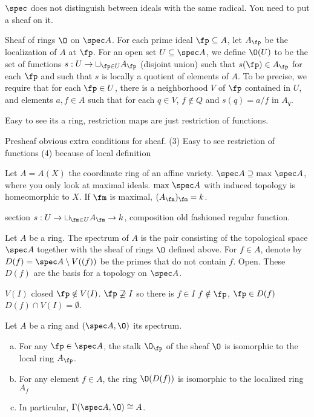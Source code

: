 $\spec$ does not distinguish between ideals with the same radical. You need to put a sheaf on it. 


\begin{dfn}
Sheaf of rings $\O$ on $\spec A$. For each prime ideal $\fp \subseteq A$, let $A_\fp$ be the localization of $A$ at $\fp$. For an open set $U \subseteq \spec A$, we define $\O(U)$ to be the set of functions $s: U  \to \sqcup_{\fp \in U} A_\fp$ (disjoint union) such that $s(\fp) \in A_\fp$ for each $\fp$ and such that $s$ is locally a quotient of elements of $A$. To be precise, we require that for each $\fp \in U$, there is a neighborhood $V$ of $\fp$ contained in $U$, and elements $a,f \in A$ such that for each  $q \in V$, $f \notin Q$ and $s(q)= a/f$ in $A_q$.  
\end{dfn}


Easy to see its a ring, restriction maps are just restriction of functions. 

Presheaf obvious
extra conditions for sheaf. 
(3) Easy to see restriction of functions 
(4) because of local definition


Let $A= A(X)$ the coordinate ring of an affine variety. $\spec A \supseteq \text{max }\spec A$, where you only look at maximal ideals. $\text{max }\spec A$ with induced topology is homeomorphic to $X$. If $\fm$ is maximal, $(A_\fm)_\fm= k$. 

section $s: U \to \sqcup_{\fm \in U} A_\fm \to k$, composition old fashioned regular function. 


\begin{dfn}
Let $A$ be a ring. The spectrum of $A$ is the pair consisting of the topological space $\spec A$ together with the sheaf of rings $\O$ defined above. For $f \in A$, denote by $D(f)= \spec A \setminus V((f))$ be the primes that do not contain $f$. Open. These $D(f)$ are the basis for a topology on $\spec A$.
\end{dfn}


$V(I)$ closed $\fp \notin V(I)$. 
$\fp \not\supseteq I$ so there is $f \in I$
$f \notin \fp$, $\fp \in D(f)$
$D(f) \cap V(I)= \emptyset$.


\begin{prop}
Let $A$ be a ring and $(\spec A, \O)$ its spectrum. 

\begin{enumerate}[(a)]
\item For any $\fp \in \spec A$, the stalk $\O_\fp$ of the sheaf $\O$ is isomorphic to the local ring $A_\fp$.
\item For any element $f \in A$, the ring $\O(D(f))$ is isomorphic to the localized ring $A_f$
\item In particular, $\Gamma(\spec A, \O) \cong A$. 
\end{enumerate}
\end{prop}


